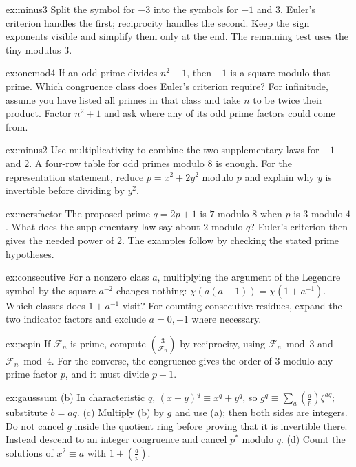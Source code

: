 \begin{hint}{ex:minus3}
Split the symbol for $-3$ into the symbols for $-1$ and $3$. Euler's criterion handles the first; reciprocity handles the second. Keep the sign exponents visible and simplify them only at the end. The remaining test uses the tiny modulus $3$.
\end{hint}
\begin{hint}{ex:onemod4}
If an odd prime divides $n^2+1$, then $-1$ is a square modulo that prime. Which congruence class does Euler's criterion require? For infinitude, assume you have listed all primes in that class and take $n$ to be twice their product. Factor $n^2+1$ and ask where any of its odd prime factors could come from.
\end{hint}
\begin{hint}{ex:minus2}
Use multiplicativity to combine the two supplementary laws for $-1$ and $2$. A four-row table for odd primes modulo $8$ is enough. For the representation statement, reduce $p=x^2+2y^2$ modulo $p$ and explain why $y$ is invertible before dividing by $y^2$.
\end{hint}
\begin{hint}{ex:mersfactor}
The proposed prime $q=2p+1$ is $7$ modulo $8$ when $p$ is $3$ modulo $4$. What does the supplementary law say about $2$ modulo $q$? Euler's criterion then gives the needed power of $2$. The examples follow by checking the stated prime hypotheses.
\end{hint}
\begin{hint}{ex:consecutive}
For a nonzero class $a$, multiplying the argument of the Legendre symbol by the square $a^{-2}$ changes nothing: $\chi(a(a+1))=\chi(1+a^{-1})$. Which classes does $1+a^{-1}$ visit? For counting consecutive residues, expand the two indicator factors and exclude $a=0,-1$ where necessary.
\end{hint}
\begin{hint}{ex:pepin}
If $\mathcal F_n$ is prime, compute $\left(\frac3{\mathcal F_n}\right)$ by reciprocity, using $\mathcal F_n\bmod3$ and $\mathcal F_n\bmod4$. For the converse, the congruence gives the order of $3$ modulo any prime factor $p$, and it must divide $p-1$.
\end{hint}
\begin{hint}{ex:gausssum}
(b) In characteristic $q$, $(x+y)^q\equiv x^q+y^q$, so $g^q\equiv\sum_a\left(\frac ap\right)\zeta^{aq}$; substitute $b=aq$. (c) Multiply (b) by $g$ and use (a); then both sides are integers. Do not cancel $g$ inside the quotient ring before proving that it is invertible there. Instead descend to an integer congruence and cancel $p^*$ modulo $q$. (d) Count the solutions of $x^2\equiv a$ with $1+\left(\frac ap\right)$.
\end{hint}

